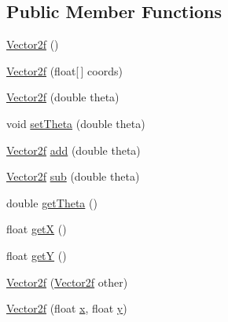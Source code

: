 \subsection*{Public Member Functions}
\begin{DoxyCompactItemize}
\item 
\mbox{\hyperlink{classorg_1_1newdawn_1_1slick_1_1geom_1_1_vector2f_a3b8e9eda9c9203462324bf4bc8e42153}{Vector2f}} ()
\item 
\mbox{\hyperlink{classorg_1_1newdawn_1_1slick_1_1geom_1_1_vector2f_add8354d0badd945a429e6359d1587073}{Vector2f}} (float\mbox{[}$\,$\mbox{]} coords)
\item 
\mbox{\hyperlink{classorg_1_1newdawn_1_1slick_1_1geom_1_1_vector2f_a6c1b8e42325a719e2eae4ead5a943f9a}{Vector2f}} (double theta)
\item 
void \mbox{\hyperlink{classorg_1_1newdawn_1_1slick_1_1geom_1_1_vector2f_aa6922f08881bf7465883171ab2f8a61a}{set\+Theta}} (double theta)
\item 
\mbox{\hyperlink{classorg_1_1newdawn_1_1slick_1_1geom_1_1_vector2f}{Vector2f}} \mbox{\hyperlink{classorg_1_1newdawn_1_1slick_1_1geom_1_1_vector2f_a5ff3506ceb149848fd7ea65ef00176c2}{add}} (double theta)
\item 
\mbox{\hyperlink{classorg_1_1newdawn_1_1slick_1_1geom_1_1_vector2f}{Vector2f}} \mbox{\hyperlink{classorg_1_1newdawn_1_1slick_1_1geom_1_1_vector2f_ac263b2353b2e095d13cb7ca169c04c5d}{sub}} (double theta)
\item 
double \mbox{\hyperlink{classorg_1_1newdawn_1_1slick_1_1geom_1_1_vector2f_a84195f4ba1d982a324cf8ce49f981d6d}{get\+Theta}} ()
\item 
float \mbox{\hyperlink{classorg_1_1newdawn_1_1slick_1_1geom_1_1_vector2f_ad706bc5b80f139236e643a274947262b}{getX}} ()
\item 
float \mbox{\hyperlink{classorg_1_1newdawn_1_1slick_1_1geom_1_1_vector2f_aa26075f083c1ce0c8c87536bc008cc8c}{getY}} ()
\item 
\mbox{\hyperlink{classorg_1_1newdawn_1_1slick_1_1geom_1_1_vector2f_ae6d4e81bed40c702eed87e575a9a20a3}{Vector2f}} (\mbox{\hyperlink{classorg_1_1newdawn_1_1slick_1_1geom_1_1_vector2f}{Vector2f}} other)
\item 
\mbox{\hyperlink{classorg_1_1newdawn_1_1slick_1_1geom_1_1_vector2f_a3380e8a5517968e81695bdd51db256e2}{Vector2f}} (float \mbox{\hyperlink{classorg_1_1newdawn_1_1slick_1_1geom_1_1_vector2f_a3c72cdf13ebc511a472e1a02002fa579}{x}}, float \mbox{\hyperlink{classorg_1_1newdawn_1_1slick_1_1geom_1_1_vector2f_aa03914f0c3d32063aa90e5bd7b74688e}{y}})

\end{DoxyCompactItemize}
